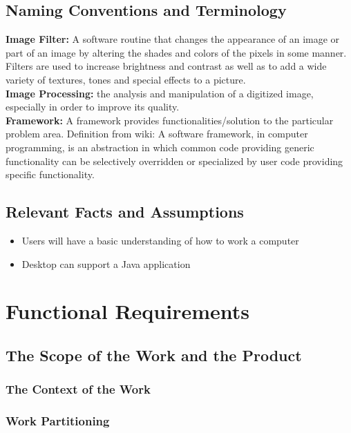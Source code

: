 \documentclass[12pt, titlepage]{article}
\begin{document}
\subsection{Naming Conventions and Terminology}

\textbf{Image Filter:} A software routine that changes the appearance of an image or part of an image by altering the shades and colors of the pixels in some manner. Filters are used to increase brightness and contrast as well as to add a wide variety of textures, tones and special effects to a picture.\\

\textbf{Image Processing:} the analysis and manipulation of a digitized image, especially in order to improve its quality.\\

\textbf{Framework:} A framework provides functionalities/solution to the particular problem area. Definition from wiki: A software framework, in computer programming, is an abstraction in which common code providing generic functionality can be selectively overridden or specialized by user code providing specific functionality.


\subsection{Relevant Facts and Assumptions}

\begin{itemize}
  \item Users will have a basic understanding of how to work a computer
  \item Desktop can support a Java application
\end{itemize}

\section{Functional Requirements}

\subsection{The Scope of the Work and the Product}

\subsubsection{The Context of the Work}

\subsubsection{Work Partitioning}
\end{document}
